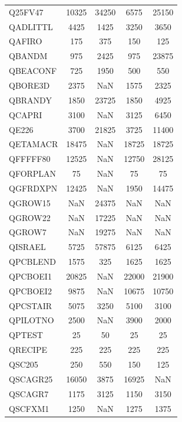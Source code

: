 \begin{longtable}{lcccc}
Q25FV47  &    10325 & 34250 &     6575 &    25150 \\
QADLITTL &     4425 &  1425 &     3250 &     3650 \\
QAFIRO   &      175 &   375 &      150 &      125 \\
QBANDM   &      975 &  2425 &      975 &    23875 \\
QBEACONF &      725 &  1950 &      500 &      550 \\
QBORE3D  &     2375 &   NaN &     1575 &     2325 \\
QBRANDY  &     1850 & 23725 &     1850 &     4925 \\
QCAPRI   &     3100 &   NaN &     3125 &     6450 \\
QE226    &     3700 & 21825 &     3725 &    11400 \\
QETAMACR &    18475 &   NaN &    18725 &    18725 \\
QFFFFF80 &    12525 &   NaN &    12750 &    28125 \\
QFORPLAN &       75 &   NaN &       75 &       75 \\
QGFRDXPN &    12425 &   NaN &     1950 &    14475 \\
QGROW15  &      NaN & 24375 &      NaN &      NaN \\
QGROW22  &      NaN & 17225 &      NaN &      NaN \\
QGROW7   &      NaN & 19275 &      NaN &      NaN \\
QISRAEL  &     5725 & 57875 &     6125 &     6425 \\
QPCBLEND &     1575 &   325 &     1625 &     1625 \\
QPCBOEI1 &    20825 &   NaN &    22000 &    21900 \\
QPCBOEI2 &     9875 &   NaN &    10675 &    10750 \\
QPCSTAIR &     5075 &  3250 &     5100 &     3100 \\
QPILOTNO &     2500 &   NaN &     3900 &     2000 \\
QPTEST   &       25 &    50 &       25 &       25 \\
QRECIPE  &      225 &   225 &      225 &      225 \\
QSC205   &      250 &   550 &      150 &      125 \\
QSCAGR25 &    16050 &  3875 &    16925 &      NaN \\
QSCAGR7  &     1175 &  3125 &     1150 &     3150 \\
QSCFXM1  &     1250 &   NaN &     1275 &     1375 \\

\end{longtable}
